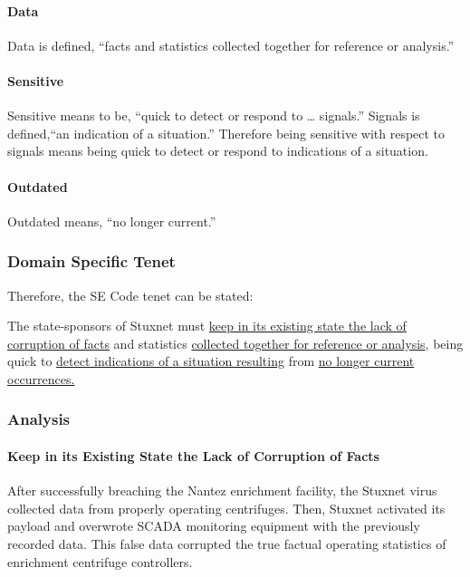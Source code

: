\documentclass[12pt]{article}
\begin{document}
\begin{multicols}{2}
\paragraph{Data}

Data is defined, ``facts and statistics collected together for reference or analysis.''\cite{dataDefinition}

\paragraph{Sensitive}

Sensitive means to be, ``quick to detect or respond to … signals.''\cite{oxfordDictionary} Signals is defined,``an indication of a situation.''\cite{oxfordDictionary} Therefore being sensitive with respect to signals means being quick to detect or respond to indications of a situation.

\paragraph{Outdated}

Outdated means, ``no longer current.''\cite{merriamWebsterDefinitions}

\subsubsection{Domain Specific Tenet}

Therefore, the SE Code tenet can be stated:

\begin{framed}
The state-sponsors of Stuxnet must \ul{keep in its existing state the lack of corruption of facts} and statistics \ul{collected together for reference or analysis}, being quick to \ul{detect indications of a situation resulting} from \ul{no longer current occurrences.}
\end{framed}

\subsubsection{Analysis}

\paragraph{Keep in its Existing State the Lack of Corruption of Facts}

After successfully breaching the Nantez enrichment facility, the Stuxnet virus collected data from properly operating centrifuges. Then, Stuxnet activated its payload and overwrote SCADA monitoring equipment with the previously recorded data.\cite{lessonsFromStuxnet} This false data corrupted the true factual operating statistics of enrichment centrifuge controllers.


\end{multicols}
\end{document}
